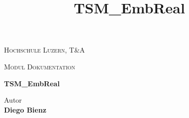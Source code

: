 
\begin{center}
\vspace{1.5cm}
{\scshape\LARGE Hochschule Luzern, T\&A \par}
{\scshape\Large Modul Dokumentation\par}
\vspace{2.0cm}
\title{TSM\_EmbReal}
{\huge\bfseries TSM\_EmbReal\par}

\vspace{16.0cm}

\end{center}

Autor \\
\textbf{Diego Bienz} \\


